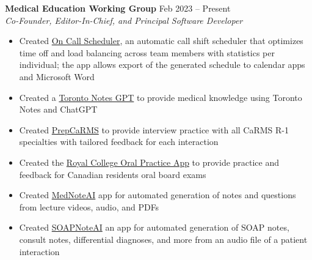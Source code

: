\documentclass{article}
\begin{document}
\textbf{Medical Education Working Group} \hfill Feb 2023 -- Present \\
\textit{Co-Founder, Editor-In-Chief, and Principal Software Developer}
\begin{itemize}
    \item Created \href{https://oncallscheduler.netlify.app/}{On Call Scheduler}, an automatic call shift scheduler that optimizes time off and load balancing across team members with statistics per individual; the app allows export of the generated schedule to calendar apps and Microsoft Word
    \item Created a \href{https://chat.openai.com/g/g-cewxRzfa6-toronto-notes}{Toronto Notes GPT} to provide medical knowledge using Toronto Notes and ChatGPT
    \item Created \href{https://prepcarms.netlify.app/}{PrepCaRMS} to provide interview practice with all CaRMS R-1 specialties with tailored feedback for each interaction
    \item Created the \href{https://github.com/tig3r66/royal-college-practice}{Royal College Oral Practice App} to provide practice and feedback for Canadian residents oral board exams
    \item Created \href{https://github.com/tig3r66/mednoteai}{MedNoteAI} app for automated generation of notes and questions from lecture videos, audio, and PDFs
    \item Created \href{https://github.com/tig3r66/mednoteai}{SOAPNoteAI} an app for automated generation of SOAP notes, consult notes, differential diagnoses, and more from an audio file of a patient interaction
\end{itemize} \vspace{1em}
\end{document}
